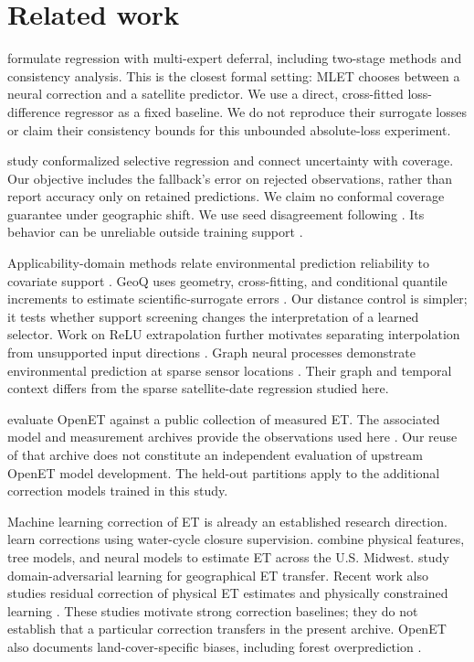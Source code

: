 \documentclass[10pt,letterpaper]{article}
\begin{document}
\section{Related work}
\citet{mao2024} formulate regression with multi-expert deferral, including two-stage methods and consistency analysis.
This is the closest formal setting: MLET chooses between a neural correction and a satellite predictor.
We use a direct, cross-fitted loss-difference regressor as a fixed baseline.
We do not reproduce their surrogate losses or claim their consistency bounds for this unbounded absolute-loss experiment.

\citet{sokol2024} study conformalized selective regression and connect uncertainty with coverage.
Our objective includes the fallback's error on rejected observations, rather than report accuracy only on retained predictions.
We claim no conformal coverage guarantee under geographic shift.
We use seed disagreement following \citet{laksh2016}.
Its behavior can be unreliable outside training support \citep{mathelin2023}.

Applicability-domain methods relate environmental prediction reliability to covariate support \citep{meyer2020}.
GeoQ uses geometry, cross-fitting, and conditional quantile increments to estimate scientific-surrogate errors \citep{nguyen2026}.
Our distance control is simpler; it tests whether support screening changes the interpretation of a learned selector.
Work on ReLU extrapolation further motivates separating interpolation from unsupported input directions \citep{xu2020}.
Graph neural processes demonstrate environmental prediction at sparse sensor locations \citep{hu2023}.
Their graph and temporal context differs from the sparse satellite-date regression studied here.


\citet{volk2024} evaluate OpenET against a public collection of measured ET.
The associated model and measurement archives provide the observations used here \citep{openetdata,fluxdata}.
Our reuse of that archive does not constitute an independent evaluation of upstream OpenET model development.
The held-out partitions apply to the additional correction models trained in this study.

Machine learning correction of ET is already an established research direction.
\citet{hascoet2022} learn corrections using water-cycle closure supervision.
\citet{rozanov2025} combine physical features, tree models, and neural models to estimate ET across the U.S. Midwest.
\citet{shi2024} study domain-adversarial learning for geographical ET transfer.
Recent work also studies residual correction of physical ET estimates and physically constrained learning \citep{residual2026,wei2026}.
These studies motivate strong correction baselines; they do not establish that a particular correction transfers in the present archive.
OpenET also documents land-cover-specific biases, including forest overprediction \citep{openetissues}.
\end{document}
